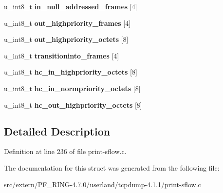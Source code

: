 \begin{DoxyCompactItemize}
\item 
\hypertarget{structsflow__100basevg__counter__t_a4c3a2e6b1947c41d6039d77305bca231}{
u\_\-int8\_\-t {\bfseries in\_\-null\_\-addressed\_\-frames} \mbox{[}4\mbox{]}}
\label{structsflow__100basevg__counter__t_a4c3a2e6b1947c41d6039d77305bca231}

\item 
\hypertarget{structsflow__100basevg__counter__t_a372b5bcafda9b873568626430acd2ee9}{
u\_\-int8\_\-t {\bfseries out\_\-highpriority\_\-frames} \mbox{[}4\mbox{]}}
\label{structsflow__100basevg__counter__t_a372b5bcafda9b873568626430acd2ee9}

\item 
\hypertarget{structsflow__100basevg__counter__t_a112fa22ccfa33ad50d69ebb2f3f1c283}{
u\_\-int8\_\-t {\bfseries out\_\-highpriority\_\-octets} \mbox{[}8\mbox{]}}
\label{structsflow__100basevg__counter__t_a112fa22ccfa33ad50d69ebb2f3f1c283}

\item 
\hypertarget{structsflow__100basevg__counter__t_ab30d6341b44af6e99b164ad3a124e614}{
u\_\-int8\_\-t {\bfseries transitioninto\_\-frames} \mbox{[}4\mbox{]}}
\label{structsflow__100basevg__counter__t_ab30d6341b44af6e99b164ad3a124e614}

\item 
\hypertarget{structsflow__100basevg__counter__t_a745720d722756023868e2c68a749f314}{
u\_\-int8\_\-t {\bfseries hc\_\-in\_\-highpriority\_\-octets} \mbox{[}8\mbox{]}}
\label{structsflow__100basevg__counter__t_a745720d722756023868e2c68a749f314}

\item 
\hypertarget{structsflow__100basevg__counter__t_aca73972865e41a319d26237dc3cebd3a}{
u\_\-int8\_\-t {\bfseries hc\_\-in\_\-normpriority\_\-octets} \mbox{[}8\mbox{]}}
\label{structsflow__100basevg__counter__t_aca73972865e41a319d26237dc3cebd3a}

\item 
\hypertarget{structsflow__100basevg__counter__t_ae03e3b1b5af210c0596ba518cc5f83ca}{
u\_\-int8\_\-t {\bfseries hc\_\-out\_\-highpriority\_\-octets} \mbox{[}8\mbox{]}}
\label{structsflow__100basevg__counter__t_ae03e3b1b5af210c0596ba518cc5f83ca}

\end{DoxyCompactItemize}


\subsection{Detailed Description}


Definition at line 236 of file print-\/sflow.c.



The documentation for this struct was generated from the following file:\begin{DoxyCompactItemize}
\item 
src/extern/PF\_\-RING-\/4.7.0/userland/tcpdump-\/4.1.1/print-\/sflow.c\end{DoxyCompactItemize}
